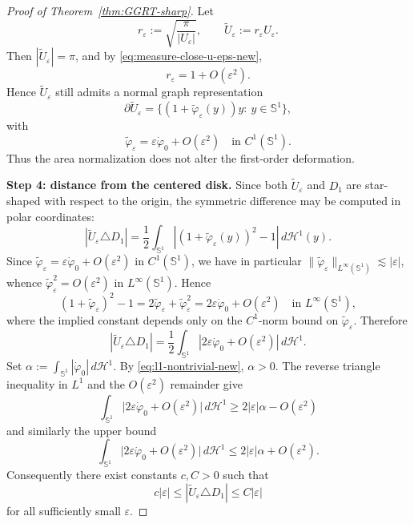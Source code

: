 \documentclass[a4paper,11pt,reqno]{amsart}
\numberwithin{equation}{section}
\theoremstyle{plain} %
\theoremstyle{definition} %
\theoremstyle{remark}
\begin{document}
\begin{proof}[Proof of Theorem~\ref{thm:GGRT-sharp}]
Let
\[
r_\varepsilon:=\sqrt{\frac{\pi}{|U_\varepsilon|}},
\qquad
\widetilde U_\varepsilon:=r_\varepsilon U_\varepsilon.
\]
Then $|\widetilde U_\varepsilon|=\pi$, and by
\eqref{eq:measure-close-u-eps-new},
\[
r_\varepsilon=1+O(\varepsilon^2).
\]
Hence $\widetilde U_\varepsilon$ still admits a normal graph representation
\[
\partial \widetilde U_\varepsilon
=
\{(1+\widetilde\varphi_\varepsilon(y))y:\ y\in \mathbb S^1\},
\]
with
\[
\widetilde\varphi_\varepsilon
=
\varepsilon \dot\varphi_0 + O(\varepsilon^2)
\quad \text{in } C^1(\mathbb S^1).
\]
Thus the area normalization does not alter the first-order deformation.

\medskip
\noindent
{\bf Step 4: distance from the centered disk.} Since both $\widetilde U_\varepsilon$ and $D_1$ are star-shaped with respect to
the origin, the symmetric difference may be computed in polar coordinates:
\[
|\widetilde U_\varepsilon \triangle D_1|
=
\frac12\int_{\mathbb S^1}
\left|(1+\widetilde\varphi_\varepsilon(y))^2-1\right|
\,d\mathcal H^1(y).
\]
Since \(\widetilde\varphi_\varepsilon=\varepsilon\dot\varphi_0+O(\varepsilon^2)\)
in \(C^1(\mathbb S^1)\), we have in particular
\(\|\widetilde\varphi_\varepsilon\|_{L^\infty(\mathbb S^1)}\lesssim |\varepsilon|\),
whence \(\widetilde\varphi_\varepsilon^2=O(\varepsilon^2)\) in
\(L^\infty(\mathbb S^1)\). Hence
\[
(1+\widetilde\varphi_\varepsilon)^2-1
=
2\widetilde\varphi_\varepsilon+\widetilde\varphi_\varepsilon^2
=
2\varepsilon \dot\varphi_0 + O(\varepsilon^2)
\quad \text{in } L^\infty(\mathbb S^1),
\]
where the implied constant depends only on the \(C^1\)-norm bound on
\(\widetilde\varphi_\varepsilon\). Therefore
\[
|\widetilde U_\varepsilon \triangle D_1|
=
\frac12\int_{\mathbb S^1}
\left|2\varepsilon \dot\varphi_0 + O(\varepsilon^2)\right|
\,d\mathcal H^1.
\]
Set \(\alpha:=\int_{\mathbb S^1}|\dot\varphi_0|\,d\mathcal H^1\). By
\eqref{eq:l1-nontrivial-new}, \(\alpha>0\). The reverse triangle inequality in
\(L^1\) and the \(O(\varepsilon^2)\) remainder give
\[
\int_{\mathbb S^1}\bigl|2\varepsilon\dot\varphi_0+O(\varepsilon^2)\bigr|\,d\mathcal H^1
\geq
2|\varepsilon|\alpha-O(\varepsilon^2)
\]
and similarly the upper bound
\[
\int_{\mathbb S^1}\bigl|2\varepsilon\dot\varphi_0+O(\varepsilon^2)\bigr|\,d\mathcal H^1
\leq
2|\varepsilon|\alpha+O(\varepsilon^2).
\]
Consequently there exist constants $c,C>0$ such that
\begin{equation}\label{eq:distance-centered-disk-new}
c|\varepsilon|
\leq
|\widetilde U_\varepsilon \triangle D_1|
\leq
C|\varepsilon|
\end{equation}
for all sufficiently small $\varepsilon$.


\end{proof}
\end{document}
